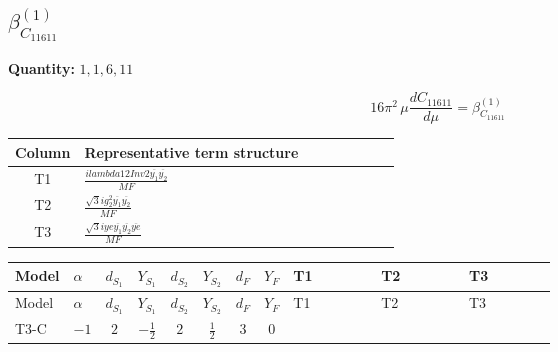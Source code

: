 \documentclass[8pt]{article}
\begin{document}
\begin{landscape}
\section*{$\beta_{C_{11611}}^{(1)}$}
\noindent\textbf{Quantity: }$\mathrm{1,1,6,11}$\par\smallskip
\[16\pi^2\,\mu\frac{d C_{11611}}{d\mu}=\beta_{C_{11611}}^{(1)}\]
\begin{center}
\begin{tabular}{@{}c >{\raggedright\arraybackslash}p{0.82\linewidth}@{}}
\toprule
Column & Representative term structure \\
\midrule
T1 & \(\displaystyle \frac{i lambda12Inv2 \overline{y_{1}} \overline{y_{2}}}{MF}\) \\
\midrule
T2 & \(\displaystyle \frac{\sqrt{3} i g_{2}^{2} \overline{y_{1}} \overline{y_{2}}}{MF}\) \\
\midrule
T3 & \(\displaystyle \frac{\sqrt{3} i ye \overline{y_{1}} \overline{y_{2}} \overline{ye}}{MF}\) \\
\midrule
\bottomrule
\end{tabular}
\end{center}
\smallskip
\tiny
\begin{longtable}{@{}llcccccc >{\raggedright\arraybackslash}p{0.21\linewidth} >{\raggedright\arraybackslash}p{0.21\linewidth} >{\raggedright\arraybackslash}p{0.21\linewidth}@{}}
\toprule
Model & $\alpha$ & $d_{S_1}$ & $Y_{S_1}$ & $d_{S_2}$ & $Y_{S_2}$ & $d_F$ & $Y_F$ & T1 & T2 & T3 \\
\midrule
\endfirsthead
\toprule
Model & $\alpha$ & $d_{S_1}$ & $Y_{S_1}$ & $d_{S_2}$ & $Y_{S_2}$ & $d_F$ & $Y_F$ & T1 & T2 & T3 \\
\midrule
\endhead
T3-C & $-1$ & $2$ & $-\frac{1}{2}$ & $2$ & $\frac{1}{2}$ & $3$ & $0$ & \scriptsize\adjustbox{max width=\linewidth}{$\begin{gathered} - \frac{i lambda12Inv2 \overline{y_{1}} \overline{y_{2}}}{3 MF}\end{gathered}$} & \scriptsize\adjustbox{max width=\linewidth}{$\begin{gathered} - \frac{\sqrt{3} i g_{2}^{2} \overline{y_{1}} \overline{y_{2}}}{4 MF}\end{gathered}$} & \scriptsize\adjustbox{max width=\linewidth}{$\begin{gathered} \frac{\sqrt{3} i ye \overline{y_{1}} \overline{y_{2}} \overline{ye}}{12 MF}\end{gathered}$} \\
\midrule
\bottomrule
\end{longtable}
\clearpage

\end{landscape}
\end{document}
